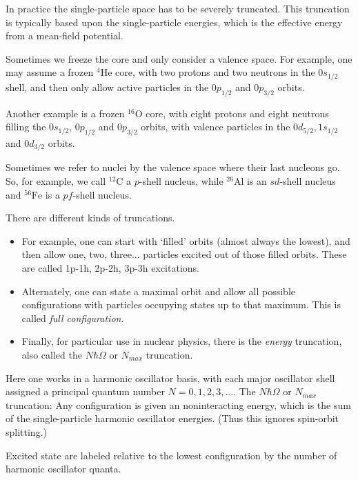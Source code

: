  In practice the single-particle space has to be severely truncated.  This truncation is 
typically based upon the single-particle energies, which is the effective energy 
from a mean-field potential. 

Sometimes we freeze the core and only consider a valence space. For example, one 
may assume a frozen ${}^{4}\mbox{He}$ core, with two protons and two neutrons in the $0s_{1/2}$ 
shell, and then only allow active particles in the $0p_{1/2}$ and $0p_{3/2}$ orbits. 


Another example is a frozen ${}^{16}\mbox{O}$ core, with eight protons and eight neutrons filling the 
$0s_{1/2}$,  $0p_{1/2}$ and $0p_{3/2}$ orbits, with valence particles in the 
$0d_{5/2}, 1s_{1/2}$ and $0d_{3/2}$ orbits.


Sometimes we refer to nuclei by the valence space where their last nucleons go.  
So, for example, we call ${}^{12}\mbox{C}$ a $p$-shell nucleus, while ${}^{26}\mbox{Al}$ is an 
$sd$-shell nucleus and ${}^{56}\mbox{Fe}$ is a $pf$-shell nucleus.





There are different kinds of truncations.

\begin{itemize}
\item For example, one can start with `filled' orbits (almost always the lowest), and then  allow one, two, three... particles excited out of those filled orbits. These are called  1p-1h, 2p-2h, 3p-3h excitations. 

\item Alternately, one can state a maximal orbit and allow all possible configurations with  particles occupying states up to that maximum. This is called \emph{full configuration}.

\item Finally, for particular use in nuclear physics, there is the \emph{energy} truncation, also  called the $N\hbar\Omega$ or $N_{max}$ truncation. 
\end{itemize}

\noindent
Here one works in a harmonic oscillator basis, with each major oscillator shell assigned  a principal quantum number $N=0,1,2,3,...$. 
The $N\hbar\Omega$ or $N_{max}$ truncation: Any configuration is given an noninteracting energy, which is the sum 
of the single-particle harmonic oscillator energies. (Thus this ignores 
spin-orbit splitting.)

Excited state are labeled relative to the lowest configuration by the 
number of harmonic oscillator quanta.

